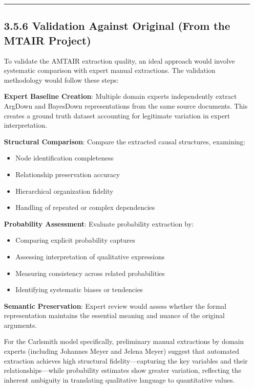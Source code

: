 \documentclass[
  11pt,
  letterpaper,
]{book}
\providecommand{\tightlist}{%
  \setlength{\itemsep}{0pt}\setlength{\parskip}{0pt}}
\begin{document}
\begin{center}\rule{0.5\linewidth}{0.5pt}\end{center}

\subsection{3.5.6 Validation Against Original (From the MTAIR
Project)}\label{sec-carlsmith-validation}

To validate the AMTAIR extraction quality, an ideal approach would
involve systematic comparison with expert manual extractions. The
validation methodology would follow these steps:

\textbf{Expert Baseline Creation}: Multiple domain experts independently
extract ArgDown and BayesDown representations from the same source
documents. This creates a ground truth dataset accounting for legitimate
variation in expert interpretation.

\textbf{Structural Comparison}: Compare the extracted causal structures,
examining:

\begin{itemize}
\tightlist
\item
  Node identification completeness
\item
  Relationship preservation accuracy
\item
  Hierarchical organization fidelity
\item
  Handling of repeated or complex dependencies
\end{itemize}

\textbf{Probability Assessment}: Evaluate probability extraction by:

\begin{itemize}
\tightlist
\item
  Comparing explicit probability captures
\item
  Assessing interpretation of qualitative expressions
\item
  Measuring consistency across related probabilities
\item
  Identifying systematic biases or tendencies
\end{itemize}

\textbf{Semantic Preservation}: Expert review would assess whether the
formal representation maintains the essential meaning and nuance of the
original arguments.

For the Carlsmith model specifically, preliminary manual extractions by
domain experts (including Johannes Meyer and Jelena Meyer) suggest that
automated extraction achieves high structural fidelity---capturing the
key variables and their relationships---while probability estimates show
greater variation, reflecting the inherent ambiguity in translating
qualitative language to quantitative values.
\end{document}
